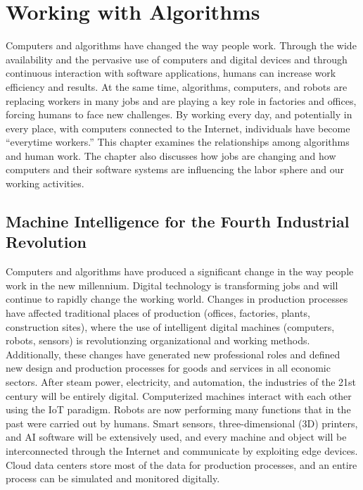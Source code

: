 




%

\setcounter{chapter}{5}

\chapter{\label{chap:6}Working with Algorithms}

{Computers and algorithms have changed the way people work. Through the wide availability and the pervasive use of computers and digital devices and through continuous interaction with software applications, humans can increase work efficiency and results. At the same time, algorithms, computers, and robots are replacing workers in many jobs and are playing a key role in factories and offices, forcing humans to face new challenges. By working every day, and potentially in every place, with computers connected to the Internet, individuals have become ``everytime workers.'' This chapter examines the relationships among algorithms and human work. The chapter also discusses how jobs are changing and how computers and their software systems are influencing the labor sphere and our working  activities.}

\section{\label{sec:6.1}Machine Intelligence for the Fourth Industrial Revolution}

Computers and algorithms have produced a significant change in the way people work in the new millennium. Digital technology is transforming jobs and will continue to rapidly change the working world. Changes in production processes have affected traditional places of production (offices, factories, plants, construction sites), where the use of intelligent digital machines (computers, robots, sensors) is revolutionzing organizational and working methods. Additionally, these changes have generated new professional roles and defined new design and production processes for goods and services in all economic sectors. After steam power, electricity, and automation, the industries of the 21st century will be entirely digital. Computerized machines interact with each other using the IoT paradigm. Robots are now performing many functions that in the past were carried out by humans. Smart sensors, three-dimensional (3D) printers, and AI software will be extensively used, and every machine and object will be interconnected through the Internet and communicate by exploiting edge devices. Cloud data centers store most of the data for production processes, and an entire process can be simulated and monitored digitally.

